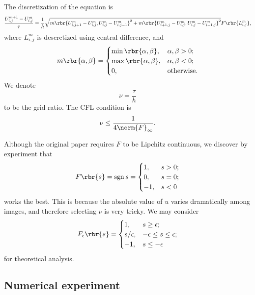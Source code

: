 \documentclass[english, nochinese]{pnote}
\DeclareMathOperator\opsgn{\mathrm{sgn}}
\begin{document}
The discretization of the equation is
\begin{equation}
\frac{ U_{ i, j }^{ m + 1 } - U_{ i, j }^m }{\tau} = \frac{1}{h} \sqrt{ m \rbr{ U_{ i, j + 1 }^m - U_{ i, j }^m, U_{ i, j }^m - U_{ i, j - 1 }^m }^2 + m \rbr{ U_{ i + 1, j }^m - U_{ i, j }^m, U_{ i, j }^m - U_{ i - 1, j }^m }^2 } F \rbr{L_{ i, j }^m},
\end{equation}
where $ L_{ i, j }^m $ is descretized using central difference, and
\begin{equation}
m \rbr{ \alpha, \beta } =
\begin{cases}
\min \rbr{ \alpha, \beta }, & \alpha, \beta > 0; \\
\max \rbr{ \alpha, \beta }, & \alpha, \beta < 0; \\
0, & \text{otherwise}.
\end{cases}
\end{equation}
We denote
\begin{equation}
\nu = \frac{\tau}{h}
\end{equation}
to be the grid ratio. The CFL condition \parencite{osher_feature-oriented_1990} is
\begin{equation}
\nu \le \frac{1}{ 4 \norm{F}_{\infty} }.
\end{equation}

Although the original paper \parencite{osher_feature-oriented_1990} requires $F$ to be Lipchitz continuous, we discover by experiment that
\begin{equation}
F \rbr{s} = \opsgn s =
\begin{cases}
1, & s > 0; \\
0, & s = 0; \\
-1, & s < 0
\end{cases}
\end{equation}
works the best. This is because the absolute value of $u$ varies dramatically among images, and therefore selecting $\nu$ is very tricky. We may consider
\begin{equation}
F_{\epsilon} \rbr{s} =
\begin{cases}
1, & s \ge \epsilon; \\
s / \epsilon, & -\epsilon \le s \le \epsilon; \\
-1, & s \le -\epsilon
\end{cases}
\end{equation}
for theoretical analysis.

\subsection{Numerical experiment}
\end{document}
